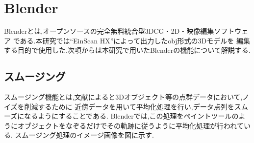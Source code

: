 \documentclass{ltjsreport}
\begin{document}
	\section{Blender}
		Blenderとは,オープンソースの完全無料統合型3DCG・2D・映像編集ソフトウェア
		である.本研究では``EinScan HX''によって出力したobj形式の3Dモデルを
		編集する目的で使用した.次項からは本研究で用いたBlenderの機能について解説する.
		\subsection{スムージング}
			スムージング機能とは,文献\cite{ref:7}によると3Dオブジェクト等の点群データにおいて,ノイズを削減するために
			近傍データを用いて平均化処理を行い,データ点列をスムーズになるようにすることである.
			Blenderでは,この処理をペイントツールのようにオブジェクトをなぞるだけでその軌跡に従うように平均化処理が行われている.
			スムージング処理のイメージ画像を図に示す.
\end{document}

